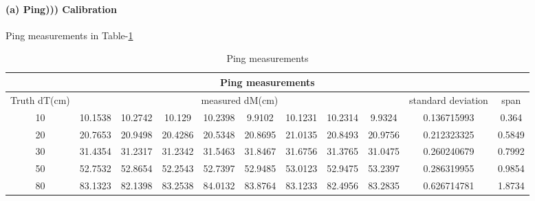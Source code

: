 \documentclass[a4paper]{article}
\begin{document}
\paragraph{(a) Ping))) Calibration}	Ping measurements in Table-\ref{tab1}
\begin{table}
\tiny
\center
  \begin{tabular}{|c|c|c|c|c|c|c|c|c|c|c|}
    \hline
    \multicolumn{11}{|c|}{Ping measurements} \\
    \hline
   Truth dT(cm) & \multicolumn{8}{|c|}{measured dM(cm)} & standard deviation & span \\
    \hline
    10 & 10.1538 & 10.2742 & 10.129 & 10.2398 & 9.9102 & 10.1231 & 10.2314 & 9.9324 & 0.136715993 & 0.364\\
	20 & 20.7653 & 20.9498 & 20.4286 & 20.5348 & 20.8695 & 21.0135 & 20.8493 & 20.9756 & 0.212323325 & 0.5849\\
	30 & 31.4354 & 31.2317 & 31.2342 & 31.5463 & 31.8467 & 31.6756 & 31.3765 & 31.0475 & 0.260240679 & 0.7992\\
	50 & 52.7532 & 52.8654 & 52.2543 & 52.7397 & 52.9485 & 53.0123 & 52.9475 & 53.2397 & 0.286319955 & 0.9854\\
	80 & 83.1323 & 82.1398 & 83.2538 & 84.0132 & 83.8764 & 83.1233 & 82.4956 & 83.2835 & 0.626714781 & 1.8734\\
    \hline
  \end{tabular}
  \caption{Ping measurements}
  \label{tab1}
\end{table}

\end{document}
